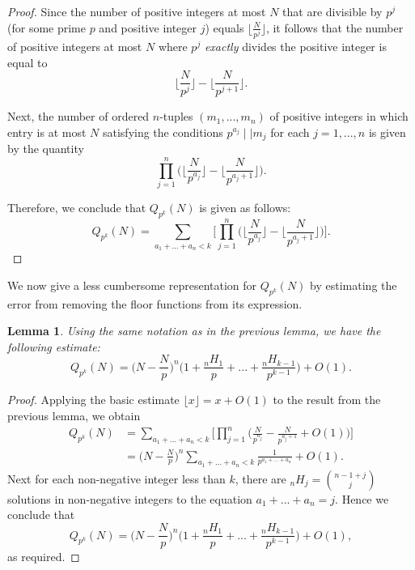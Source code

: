 \documentclass[12pt]{amsart}
\newtheorem{lemma}[theorem]{Lemma}
\theoremstyle{definition}
\begin{document}
\begin{proof}
	Since the number of positive integers at most $N$ that are divisible by $p^j$ (for some prime $p$ and positive integer $j$) equals $\lfloor\frac{N}{p^j}\rfloor$, it follows that the number of positive integers at most $N$ where $p^j$ \textit{exactly} divides the positive integer is equal to
	$$\Big\lfloor\frac{N}{p^j}\Big\rfloor - \Big\lfloor\frac{N}{p^{j+1}}\Big\rfloor.$$
	
	\noindent Next, the number of ordered $n$-tuples $(m_1, ..., m_n)$ of positive integers in which entry is at most $N$ satisfying the conditions $p^{a_j} \mid\mid m_j$ for each $j = 1, ..., n$ is given by the quantity
	$$\prod_{j=1}^n \Big(\Big\lfloor\frac{N}{p^{a_j}}\Big\rfloor - \Big\lfloor\frac{N}{p^{a_j+1}}\Big\rfloor\Big).$$
	
	\noindent Therefore, we conclude that $Q_{p^k}(N)$ is given as follows:
	$$Q_{p^k}(N) = \sum_{a_1+...+a_n < k} \Big[\prod_{j=1}^n \Big(\Big\lfloor \frac{N}{p^{a_j}}\Big\rfloor - \Big\lfloor \frac{N}{p^{a_j + 1}}\Big\rfloor\Big)\Big].$$
\end{proof}

We now give a less cumbersome representation for $Q_{p^k}(N)$ by estimating the error from removing the floor functions from its expression.

\begin{lemma}
	Using the same notation as in the previous lemma, we have the following estimate:
	$$Q_{p^k}(N) = \Big(N - \frac{N}{p}\Big)^n \Big(1 + \frac{{}_nH_1}{p} + ... + \frac{{}_nH_{k-1}}{p^{k-1}}\Big) + O(1).$$
\end{lemma}

\begin{proof}
	Applying the basic estimate $\lfloor x \rfloor  = x + O(1)$ to the result from the previous lemma, we obtain
	\begin{align*} Q_{p^k}(N) &= \sum_{a_1+...+a_n < k} \Big[\prod_{j=1}^n \Big( \frac{N}{p^{a_j}} - \frac{N}{p^{a_j + 1}} + O(1)\Big)\Big]\\ &= \Big(N - \frac{N}{p}\Big)^n \sum_{a_1+...+a_n < k} \frac{1}{p^{a_1 + ... + a_n}} + O(1). \end{align*} 
	\noindent Next for each non-negative integer less than $k$, there are ${}_nH_j = \binom{n-1+j}{j}$ solutions in non-negative integers to the equation $a_1+...+a_n = j$. Hence we conclude that
	$$Q_{p^k}(N) = \Big(N - \frac{N}{p}\Big)^n \Big(1 + \frac{{}_nH_1}{p} + ... + \frac{{}_nH_{k-1}}{p^{k-1}}\Big) + O(1),$$
	as required.
\end{proof}
\end{document}

